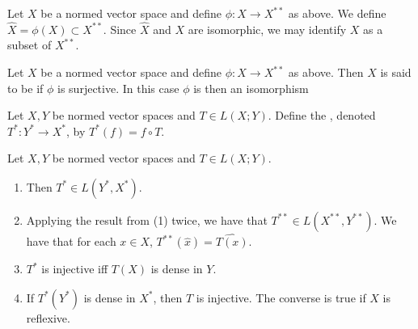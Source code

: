 \documentclass{book}
\begin{document}
	\begin{defn} \ld{}
		Let $X$ be a normed vector space and define $\phi:X \rightarrow X^{**}$ as above. We define $\widehat{X} = \phi(X) \subset X^{**}$. Since $\widehat{X}$ and $X$ are isomorphic, we may identify $X$ as a subset of $X^{**}$. 
	\end{defn}
	
	\begin{defn} \ld{}
		Let $X$ be a normed vector space and define $\phi:X \rightarrow X^{**}$ as above. Then $X$ is said to be  if $\phi$ is surjective. In this case $\phi$ is then an isomorphism
	\end{defn}

	\begin{defn}
	Let $X,Y$ be normed vector spaces and $T \in L(X; Y)$. Define the , denoted  $T^*:Y^* \rightarrow X^*$, by $T^*(f) = f \circ T$. 
	\end{defn}
	
	\begin{ex} \lex{}
		Let $X,Y$ be normed vector spaces and $T \in L(X; Y)$. 
		\begin{enumerate}
			\item Then $T^* \in L(Y^*, X^*)$.
			\item Applying the result from (1) twice, we have that $T^{**} \in L(X^{**},Y^{**})$. We have that for each $x \in X$, $T^{**}(\hat{x}) = \widehat{T(x)}$.
			\item $T^*$ is injective iff $T(X)$ is dense in $Y$.
			\item If $T^*(Y^*)$ is dense in $X^*$, then $T$ is injective. The converse is true if $X$ is reflexive.
		\end{enumerate}
	\end{ex}
	
\end{document}
